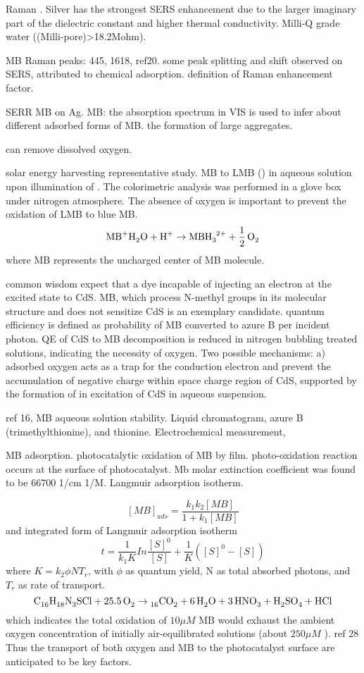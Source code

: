 Raman \cite{Xiao2007}. Silver has the strongest SERS enhancement due to the larger imaginary part of the dielectric constant and higher thermal conductivity. Milli-Q grade water ((Milli-pore)\textgreater 18.2Mohm).

MB Raman peaks: 445, 1618, ref20. some peak splitting and shift observed on SERS, attributed to chemical adsorption. definition of Raman enhancement factor.

SERR MB on Ag. \cite{Nicolai2003}
MB: the absorption spectrum in VIS is used to infer about different adsorbed forms of MB. the formation of large aggregates. 

 can remove dissolved oxygen. \cite{Wang2014a}

solar energy harvesting representative study.\cite{Yoneyama1972} MB to LMB () in aqueous solution upon illumination of . The colorimetric analysis was performed in a glove box under nitrogen atmosphere. The absence of oxygen is important to prevent the oxidation of LMB to blue MB.
\[
\cee{MB^+ H2O + H^+ \rightarrow MBH3^{2+} + 1/2O2}
\]
where MB represents the uncharged center of MB molecule.

common wisdom expect that a dye incapable of injecting an electron at the excited state to CdS. MB, which process N-methyl groups in its molecular structure and does not sensitize CdS is an exemplary candidate. quantum efficiency is defined as probability of MB converted to azure B per incident photon. QE of CdS to MB decomposition is reduced in nitrogen bubbling treated solutions, indicating the necessity of oxygen. Two possible mechanisms: a) adsorbed oxygen acts as a trap for the conduction electron and prevent the accumulation of negative charge within space charge region of CdS, supported by the formation of  in excitation of CdS in aqueous suspension.\cite{Takizawa1978}

ref 16, MB aqueous solution stability. Liquid chromatogram, azure B (trimethylthionine), and thionine. Electrochemical measurement,

MB adsorption.  photocatalytic oxidation of MB by  film. photo-oxidation reaction occurs at the surface of photocatalyst. Mb molar extinction coefficient was found to be 66700 1/cm 1/M. Langmuir adsorption isotherm.\cite{Matthews1989}

\[
[MB]_{ads} = \frac{k_1 k_2 [MB]}{1 + k_1[MB]}
\]
and integrated form of Langmuir adsorption isotherm
\[
t = \frac{1}{k_1K} In\frac{[S]^0}{[S]} + \frac{1}{K}([S]^0 - [S])
\]
where $K = k_2 \phi N T_r$, with $\phi$ as quantum yield, N as total absorbed photons, and $T_r$ as rate of transport.
\[
\cee{C16H18N3SCl + 25.5O2 \rightarrow 16CO2 + 6H2O + 3HNO3 + H2SO4 +HCl}
\]
which indicates the total oxidation of $10 \mu M$ MB would exhaust the ambient oxygen concentration of initially air-equilibrated solutions (about $250 \mu M$ ). ref 28 Thus the transport of both oxygen and MB to the photocatalyst surface are anticipated to be key factors.

